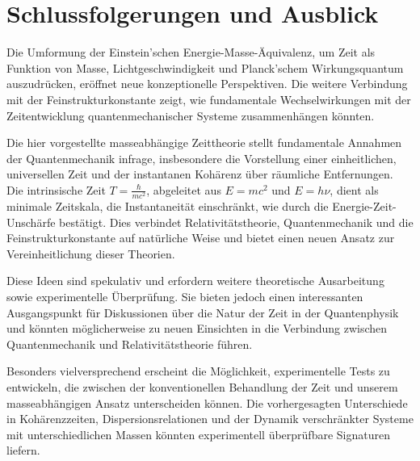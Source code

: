 \documentclass{article}
\begin{document}
	\section{Schlussfolgerungen und Ausblick}
	
	Die Umformung der Einstein’schen Energie-Masse-Äquivalenz, um Zeit als Funktion von Masse, Lichtgeschwindigkeit und Planck’schem Wirkungsquantum auszudrücken, eröffnet neue konzeptionelle Perspektiven. Die weitere Verbindung mit der Feinstrukturkonstante zeigt, wie fundamentale Wechselwirkungen mit der Zeitentwicklung quantenmechanischer Systeme zusammenhängen könnten.
	
	Die hier vorgestellte masseabhängige Zeittheorie stellt fundamentale Annahmen der Quantenmechanik infrage, insbesondere die Vorstellung einer einheitlichen, universellen Zeit und der instantanen Kohärenz über räumliche Entfernungen. Die intrinsische Zeit $T = \frac{\hbar}{mc^2}$, abgeleitet aus $E = mc^2$ und $E = h\nu$, dient als minimale Zeitskala, die Instantaneität einschränkt, wie durch die Energie-Zeit-Unschärfe bestätigt. Dies verbindet Relativitätstheorie, Quantenmechanik und die Feinstrukturkonstante auf natürliche Weise und bietet einen neuen Ansatz zur Vereinheitlichung dieser Theorien.
	
	Diese Ideen sind spekulativ und erfordern weitere theoretische Ausarbeitung sowie experimentelle Überprüfung. Sie bieten jedoch einen interessanten Ausgangspunkt für Diskussionen über die Natur der Zeit in der Quantenphysik und könnten möglicherweise zu neuen Einsichten in die Verbindung zwischen Quantenmechanik und Relativitätstheorie führen.
	
	Besonders vielversprechend erscheint die Möglichkeit, experimentelle Tests zu entwickeln, die zwischen der konventionellen Behandlung der Zeit und unserem masseabhängigen Ansatz unterscheiden können. Die vorhergesagten Unterschiede in Kohärenzzeiten, Dispersionsrelationen und der Dynamik verschränkter Systeme mit unterschiedlichen Massen könnten experimentell überprüfbare Signaturen liefern.
	
\end{document}
